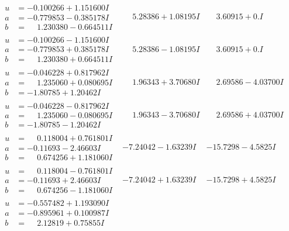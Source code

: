 \documentclass[1p]{elsarticle_modified}
\theoremstyle{definition}
\begin{document}
$$\begin{array}{c|c|c}
\begin{aligned}
u &= -0.100266 + 1.151600 I \\
a &= -0.779853 - 0.385178 I \\
b &= \phantom{-}1.230380 - 0.664511 I\end{aligned}
 & \phantom{-}5.28386 + 1.08195 I & \phantom{-}3.60915 + 0. I\phantom{ +0.000000I} \\ \hline\begin{aligned}
u &= -0.100266 - 1.151600 I \\
a &= -0.779853 + 0.385178 I \\
b &= \phantom{-}1.230380 + 0.664511 I\end{aligned}
 & \phantom{-}5.28386 - 1.08195 I & \phantom{-}3.60915 + 0. I\phantom{ +0.000000I} \\ \hline\begin{aligned}
u &= -0.046228 + 0.817962 I \\
a &= \phantom{-}1.235060 + 0.080695 I \\
b &= -1.80785 + 1.20462 I\end{aligned}
 & \phantom{-}1.96343 + 3.70680 I & \phantom{-}2.69586 - 4.03700 I \\ \hline\begin{aligned}
u &= -0.046228 - 0.817962 I \\
a &= \phantom{-}1.235060 - 0.080695 I \\
b &= -1.80785 - 1.20462 I\end{aligned}
 & \phantom{-}1.96343 - 3.70680 I & \phantom{-}2.69586 + 4.03700 I \\ \hline\begin{aligned}
u &= \phantom{-}0.118004 + 0.761801 I \\
a &= -0.11693 - 2.46603 I \\
b &= \phantom{-}0.674256 + 1.181060 I\end{aligned}
 & -7.24042 - 1.63239 I & -15.7298 - 4.5825 I \\ \hline\begin{aligned}
u &= \phantom{-}0.118004 - 0.761801 I \\
a &= -0.11693 + 2.46603 I \\
b &= \phantom{-}0.674256 - 1.181060 I\end{aligned}
 & -7.24042 + 1.63239 I & -15.7298 + 4.5825 I \\ \hline\begin{aligned}
u &= -0.557482 + 1.193090 I \\
a &= -0.895961 + 0.100987 I \\
b &= \phantom{-}2.12819 + 0.75855 I\end{aligned}

\end{array}$$
\end{document}
